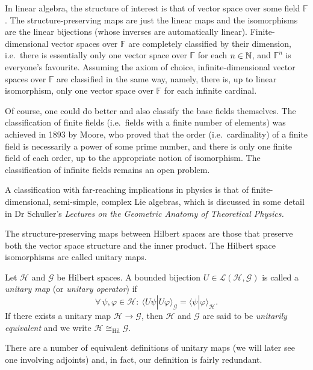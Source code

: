 In linear algebra, the structure of interest is that of vector space
over some field $\mathbb{F}$. The structure-preserving maps are just
the linear maps and the isomorphisms are the linear bijections (whose
inverses are automatically linear). Finite-dimensional vector spaces
over $\mathbb{F}$ are completely classified by their dimension, i.e.\
there is essentially only one vector space over $\mathbb{F}$ for each
$n\in \mathbb{N}$, and $\mathbb{F}^n$ is everyone's favourite.  Assuming the
axiom of choice,
infinite-dimensional vector spaces over $\mathbb{F}$ are classified in
the  same way, namely, there is, up to linear isomorphism, only one
vector space over $\mathbb{F}$ for each infinite cardinal.

Of course, one could do better and also classify the base fields
themselves. The classification of finite fields (i.e.\ fields with a
finite number of elements) was achieved in 1893 by Moore, who proved
that the order (i.e.\ cardinality) of a finite field is necessarily a
power of some prime number, and there is only one finite field of each
order, up to the appropriate notion of isomorphism. The classification
of infinite fields remains an open problem.

A classification with far-reaching implications in physics is that of
finite-dimensio\-nal, semi-simple, complex Lie algebras, which is
discussed in some detail in Dr Schuller's \textit{Lectures on the
Geometric Anatomy of Theoretical Physics.}

The structure-preserving maps between Hilbert spaces are those that
preserve both the vector space structure and the inner product. The
Hilbert space isomorphisms are called unitary maps.

\begin{definition}
Let $\mathcal{H}$ and $\mathcal{G}$ be Hilbert spaces. A bounded bijection $U\in\mathcal{L}(\mathcal{H},\mathcal{G})$ is called a \emph{unitary map} (or \emph{unitary operator}) if
\begin{equation*}
\forall \, \psi,\varphi\in\mathcal{H} : \
\langle U \psi|U\varphi \rangle_{\mathcal{G}}=\langle \psi|\varphi \rangle_{\mathcal{H}}.
\end{equation*}
If there exists a unitary map $\mathcal{H}\to\mathcal{G}$, then $\mathcal{H}$ and $\mathcal{G}$ are said to be \emph{unitarily equivalent} and we write $\mathcal{H}\cong_{\mathrm{Hil}}\mathcal{G}$.
\end{definition}

There are a number of equivalent definitions of unitary maps (we will later see one involving adjoints) and, in fact, our definition is fairly redundant. 

